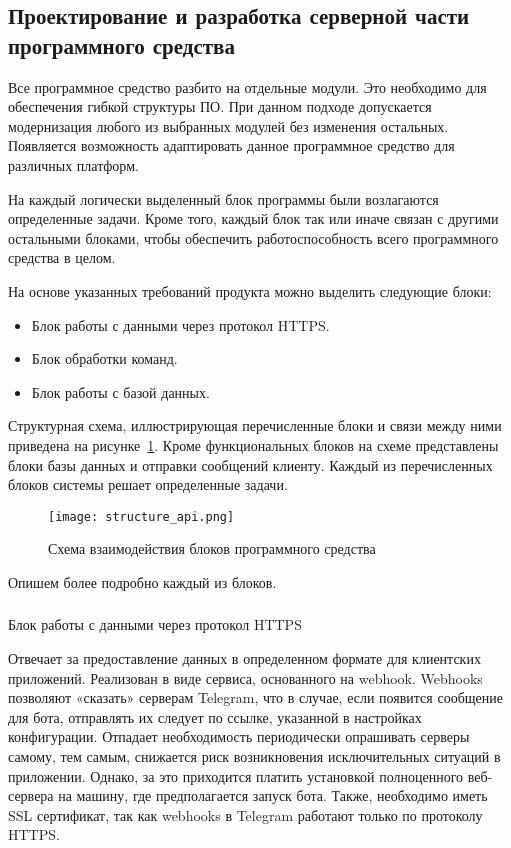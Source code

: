 \subsection{Проектирование и разработка серверной части программного средства}
\label{sec:design:server}

Все программное средство разбито на отдельные модули. Это
необходимо для обеспечения гибкой структуры ПО. При данном подходе
допускается модернизация любого из выбранных модулей без изменения
остальных. Появляется возможность адаптировать данное программное
средство для различных платформ.

На каждый логически выделенный блок программы были возлагаются
определенные задачи. Кроме того, каждый блок так или иначе связан с
другими остальными блоками, чтобы обеспечить работоспособность всего
программного средства в целом.

На основе указанных требований продукта можно выделить следующие
блоки:

\begin{itemize}
	\item Блок работы с данными через протокол HTTPS.
	\item Блок обработки команд.
	\item Блок работы с базой данных.
\end{itemize}

Структурная схема, иллюстрирующая перечисленные блоки и связи
между ними приведена на рисунке~\ref{fig:design:architecture:structure_api}. Кроме функциональных блоков на
схеме представлены блоки базы данных и отправки сообщений клиенту.
Каждый из перечисленных блоков системы решает определенные задачи.

\begin{figure}[!h]
\centering
	\texttt{[image: structure\_api.png]}
	\caption{Схема взаимодействия блоков программного средства}
	\label{fig:design:architecture:structure_api}
\end{figure}

Опишем более подробно каждый из блоков.

\subsubsection{} Блок работы с данными через протокол HTTPS
\label{sec:design:server:api}

Отвечает за предоставление данных в определенном формате для клиентских приложений. Реализован в виде сервиса, основанного на webhook. Webhooks позволяют «сказать» серверам Telegram, что в случае, если появится сообщение для бота, отправлять их следует по ссылке, указанной в настройках конфигурации. Отпадает необходимость периодически опрашивать серверы самому, тем самым, снижается риск возникновения исключительных ситуаций в приложении. Однако, за это приходится платить установкой полноценного веб-сервера на машину, где предполагается запуск бота. Также, необходимо иметь SSL сертификат, так как webhooks в Telegram работают только по протоколу HTTPS.

